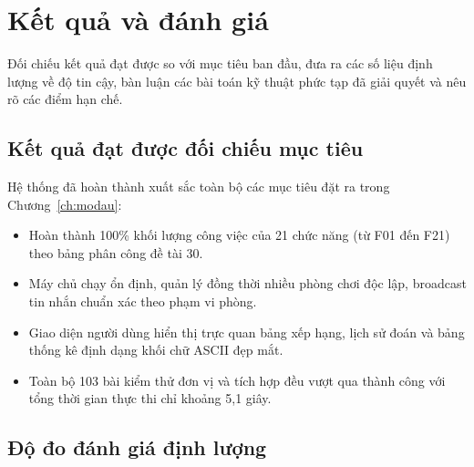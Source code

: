 \chapter{Kết quả và đánh giá}
\label{ch:ketqua}

\begin{muctieu}
Đối chiếu kết quả đạt được so với mục tiêu ban đầu, đưa ra các số liệu định
lượng về độ tin cậy, bàn luận các bài toán kỹ thuật phức tạp đã giải quyết và
nêu rõ các điểm hạn chế.
\end{muctieu}

\section{Kết quả đạt được đối chiếu mục tiêu}

Hệ thống đã hoàn thành xuất sắc toàn bộ các mục tiêu đặt ra trong
Chương~\ref{ch:modau}:
\begin{itemize}[leftmargin=1.6em, itemsep=2pt]
  \item Hoàn thành 100\% khối lượng công việc của 21 chức năng (từ F01 đến
        F21) theo bảng phân công đề tài 30.
  \item Máy chủ  chạy ổn định, quản lý đồng thời nhiều phòng
        chơi độc lập, broadcast tin nhắn chuẩn xác theo phạm vi phòng.
  \item Giao diện người dùng  hiển thị trực quan bảng xếp hạng,
        lịch sử đoán và bảng thống kê định dạng khối chữ ASCII đẹp mắt.
  \item Toàn bộ 103 bài kiểm thử đơn vị và tích hợp đều vượt qua thành công
        với tổng thời gian thực thi chỉ khoảng 5,1 giây.
\end{itemize}

\section{Độ đo đánh giá định lượng}

